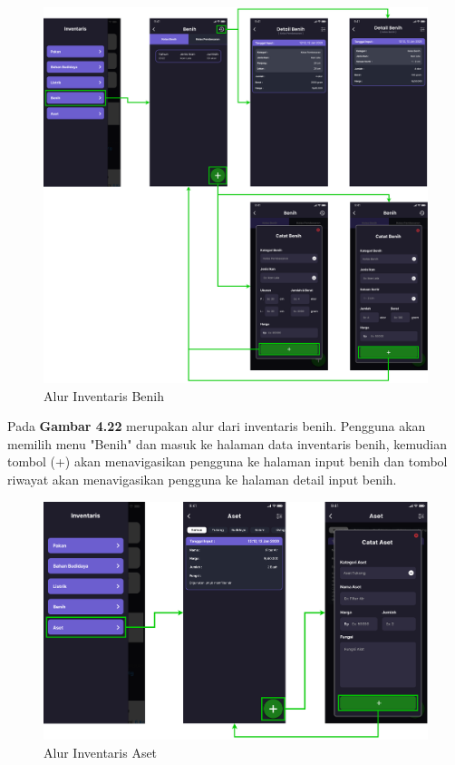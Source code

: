 \begin{spacing}{1.5}
	\begin{figure}[H]
		\centering
		\includegraphics[width=1\textwidth]{gambar/sprint2/flow_seed.png}
		\caption{Alur Inventaris Benih}
	\end{figure}

	Pada \textbf{Gambar 4.22} merupakan alur dari inventaris benih. Pengguna akan memilih menu "Benih" dan masuk ke halaman data inventaris benih, kemudian tombol (+) akan menavigasikan pengguna ke halaman input benih dan tombol riwayat akan menavigasikan pengguna ke halaman detail input benih.

	\begin{figure}[H]
		\centering
		\includegraphics[width=1\textwidth]{gambar/sprint2/flow_asset.png}
		\caption{Alur Inventaris Aset}
	\end{figure}


\end{spacing}
